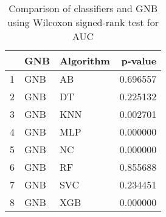 \begin{table}
\footnotesize
\caption{Comparison of classifiers and GNB using Wilcoxon signed-rank test for AUC}
\label{tab:GNB wilcoxon AUC comparison}
\begin{tabular}{lllr}
\hline
 & GNB & Algorithm & p-value \\
\hline
1 & GNB & AB & 0.696557 \\
2 & GNB & DT & 0.225132 \\
3 & GNB & KNN & 0.002701 \\
4 & GNB & MLP & 0.000000 \\
5 & GNB & NC & 0.000000 \\
6 & GNB & RF & 0.855688 \\
7 & GNB & SVC & 0.234451 \\
8 & GNB & XGB & 0.000000 \\
\hline
\end{tabular}
\end{table}
